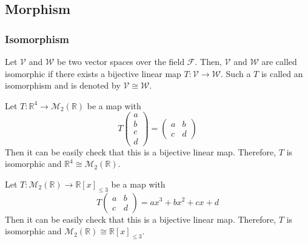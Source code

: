 \subsection{Morphism}\label{subsec-morphism}

\subsubsection{Isomorphism}\label{subsubsec-isomorphism}

\begin{definition}\label{def-isomorphism}
	Let $\mathcal{V}$ and $\mathcal{W}$ be two vector spaces over the field $\mathcal{F}$.
	Then, $\mathcal{V}$ and $\mathcal{W}$ are called isomorphic if there exists a bijective
	linear map $T:\mathcal{V}\to\mathcal{W}$. Such a $T$ is called an isomorphism and is
	denoted by $\mathcal{V}\cong\mathcal{W}$.
\end{definition}

\begin{exm}\label{exm-isomorphic:1}
	Let $T:\mathbb{R}^4\to\mathcal{M}_2(\mathbb{R})$ be a map with
	\begin{equation*}
		T\begin{pmatrix}
			a \\ b \\ c \\ d
		\end{pmatrix}=\begin{pmatrix}
			a & b \\
			c & d
		\end{pmatrix}
	\end{equation*}
	Then it can be easily check that this is a bijective linear map. Therefore,
	$T$ is isomorphic and $\mathbb{R}^4\cong\mathcal{M}_2(\mathbb{R})$.
\end{exm}

\begin{exm}\label{exm-isomorphic:2}
	Let $T:\mathcal{M}_2(\mathbb{R})\to\mathbb{R}[x]_{\leq3}$ be a map with
	\begin{equation*}
		T\begin{pmatrix}
			a & b \\
			c & d
		\end{pmatrix}=ax^3+bx^2+cx+d
	\end{equation*}
	Then it can be easily check that this is a bijective linear map. Therefore,
	$T$ is isomorphic and $\mathcal{M}_2(\mathbb{R})\cong\mathbb{R}[x]_{\leq3}$.
\end{exm}

